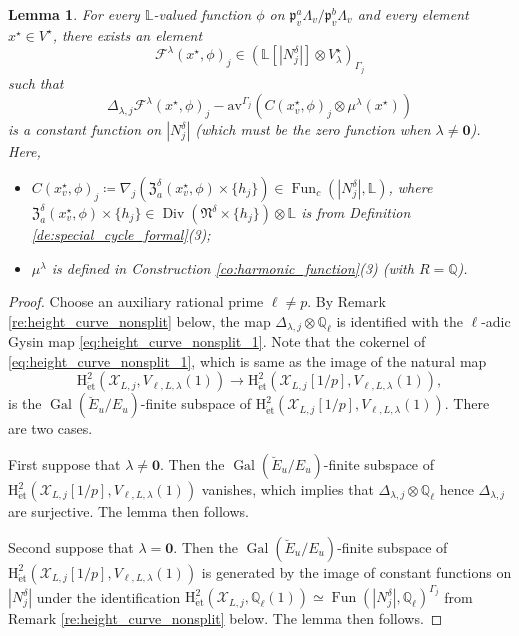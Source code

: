 \documentclass[12pt]{amsart}
\numberwithin{equation}{section}
\theoremstyle{plain}
\newtheorem{lem}[proposition]{Lemma}
\theoremstyle{definition}
\theoremstyle{remark}
\renewcommand{\b}[1]{\mathbf{#1}}
\renewcommand{\c}[1]{\mathcal{#1}}
\renewcommand{\d}[1]{\mathbb{#1}}
\newcommand{\f}[1]{\mathfrak{#1}}
\renewcommand{\r}[1]{\mathrm{#1}}
\renewcommand{\(}{\left(}
\renewcommand{\)}{\right)}
\newcommand{\cF}{\c F}
\newcommand{\cX}{\c X}
\newcommand{\dL}{\d L}
\newcommand{\dQ}{\d Q}
\newcommand{\fN}{\f N}
\newcommand{\fZ}{\f Z}
\newcommand{\fp}{\f p}
\newcommand{\rH}{\r H}
\newcommand{\et}{{\acute{\r{e}}\r{t}}}
\DeclareMathOperator{\Div}{Div}
\DeclareMathOperator{\Fun}{Fun}
\DeclareMathOperator{\Gal}{Gal}
\begin{document}
\begin{lem}\label{le:height_curve_nonsplit_1}
For every $\dL$-valued function $\phi$ on $\fp_v^a\Lambda_v/\fp_v^b\Lambda_v$ and every element $x^\star\in V^\star$, there exists an element
\[
\cF^\lambda(x^\star,\phi)_j\in\(\dL[|N^\delta_j|]\otimes V^\star_\lambda\)_{\Gamma_j}
\]
such that
\[
\Delta_{\lambda,j}\cF^\lambda(x^\star,\phi)_j-\r{av}^{\Gamma_j}\(C(x^\star_v,\phi)_j\otimes \mu^\lambda(x^\star)\)
\]
is a constant function on $|N^\delta_j|$ (which must be the zero function when $\lambda\neq\b{0}$). Here,
\begin{itemize}
  \item $C(x^\star_v,\phi)_j\coloneqq\nabla_j\(\fZ_a^\delta(x^\star_v,\phi)\times\{h_j\}\)\in\Fun_c(|N^\delta_j|,\dL)$, where $\fZ_a^\delta(x^\star_v,\phi)\times\{h_j\}\in\Div(\fN^\delta\times\{h_j\})\otimes\dL$ is from Definition \ref{de:special_cycle_formal}(3);

  \item $\mu^\lambda$ is defined in Construction \ref{co:harmonic_function}(3) (with $R=\dQ$).
\end{itemize}
\end{lem}


\begin{proof}
Choose an auxiliary rational prime $\ell\neq p$. By Remark \ref{re:height_curve_nonsplit} below, the map $\Delta_{\lambda,j}\otimes\dQ_\ell$ is identified with the $\ell$-adic Gysin map \eqref{eq:height_curve_nonsplit_1}. Note that the cokernel of \eqref{eq:height_curve_nonsplit_1}, which is same as the image of the natural map
\[
\rH^2_{\et}(\cX_{L,j},V_{\ell,L,\lambda}(1))\to\rH^2_{\et}(\cX_{L,j}[1/p],V_{\ell,L,\lambda}(1)),
\]
is the $\Gal(\breve{E}_u/E_u)$-finite subspace of $\rH^2_{\et}(\cX_{L,j}[1/p],V_{\ell,L,\lambda}(1))$. There are two cases.

First suppose that $\lambda\neq\b{0}$. Then the $\Gal(\breve{E}_u/E_u)$-finite subspace of $\rH^2_{\et}(\cX_{L,j}[1/p],V_{\ell,L,\lambda}(1))$ vanishes, which implies that $\Delta_{\lambda,j}\otimes\dQ_\ell$ hence $\Delta_{\lambda,j}$ are surjective. The lemma then follows.

Second suppose that $\lambda=\b{0}$. Then the $\Gal(\breve{E}_u/E_u)$-finite subspace of $\rH^2_{\et}(\cX_{L,j}[1/p],V_{\ell,L,\lambda}(1))$ is generated by the image of constant functions on $|N^\delta_j|$ under the identification $\rH^2_{\et}(\cX_{L,j},\dQ_\ell(1))\simeq\Fun(|N^\delta_j|,\dQ_\ell)^{\Gamma_j}$ from Remark \ref{re:height_curve_nonsplit} below. The lemma then follows.
\end{proof}
\end{document}
